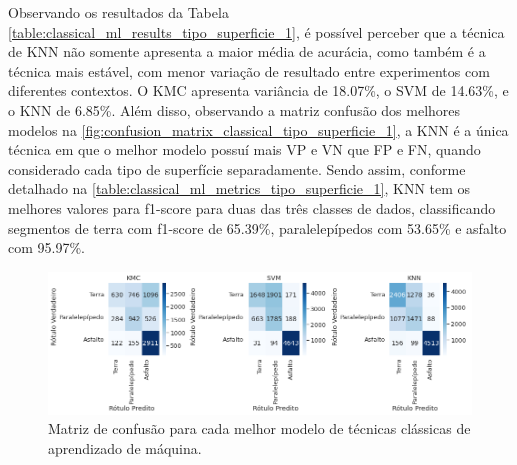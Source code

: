 Observando os resultados da Tabela \ref{table:classical_ml_results_tipo_superficie_1}, é possível perceber que a técnica de KNN não somente apresenta a maior média de acurácia, como também é a técnica mais estável, com menor variação de resultado entre experimentos com diferentes contextos. O KMC apresenta variância de 18.07\%, o SVM de 14.63\%, e o KNN de 6.85\%. Além disso, observando a matriz confusão dos melhores modelos na \autoref{fig:confusion_matrix_classical_tipo_superficie_1}, a KNN é a única técnica em que o melhor modelo possuí mais VP e VN que FP e FN, quando considerado cada tipo de superfície separadamente. Sendo assim, conforme detalhado na \autoref{table:classical_ml_metrics_tipo_superficie_1}, KNN tem os melhores valores para f1-score para duas das três classes de dados, classificando segmentos de terra com f1-score de 65.39\%, paralelepípedos com 53.65\% e asfalto com 95.97\%. 

\begin{figure}[H]
  \centering
  \caption{Matriz de confusão para cada melhor modelo de técnicas clássicas de aprendizado de máquina.}
  \label{fig:confusion_matrix_classical_tipo_superficie_1}
  \includegraphics[width=1\textwidth]{figuras/fig_34.png}
\end{figure}

